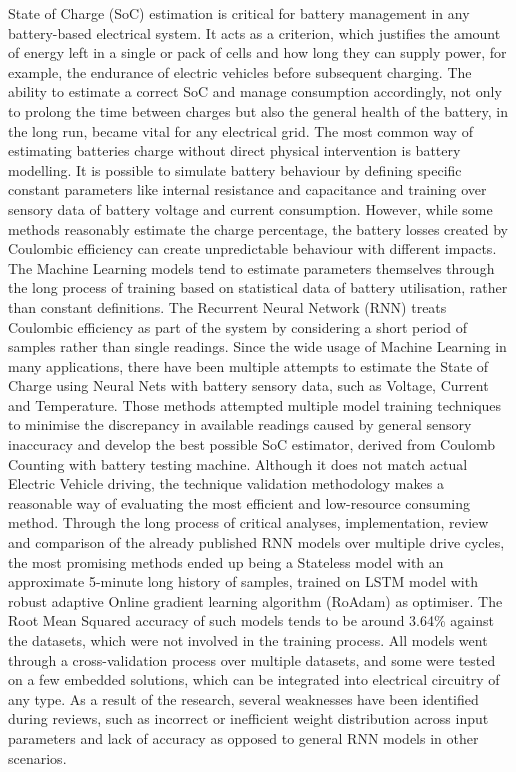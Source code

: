 %
%
{
State of Charge (SoC) estimation is critical for battery management in any battery-based electrical system.
It acts as a criterion, which justifies the amount of energy left in a single or pack of cells and how long they can supply power, for example, the endurance of electric vehicles before subsequent charging.
The ability to estimate a correct SoC and manage consumption accordingly, not only to prolong the time between charges but also the general health of the battery, in the long run, became vital for any electrical grid.
The most common way of estimating batteries charge without direct physical intervention is battery modelling.
It is possible to simulate battery behaviour by defining specific constant parameters like internal resistance and capacitance and training over sensory data of battery voltage and current consumption.
However, while some methods reasonably estimate the charge percentage, the battery losses created by Coulombic efficiency can create unpredictable behaviour with different impacts.
The Machine Learning models tend to estimate parameters themselves through the long process of training based on statistical data of battery utilisation, rather than constant definitions.
The Recurrent Neural Network (RNN) treats Coulombic efficiency as part of the system by considering a short period of samples rather than single readings.
Since the wide usage of Machine Learning in many applications, there have been multiple attempts to estimate the State of Charge using Neural Nets with battery sensory data, such as Voltage, Current and Temperature.
Those methods attempted multiple model training techniques to minimise the discrepancy in available readings caused by general sensory inaccuracy and develop the best possible SoC estimator, derived from Coulomb Counting with battery testing machine.
Although it does not match actual Electric Vehicle driving, the technique validation methodology makes a reasonable way of evaluating the most efficient and low-resource consuming method.
Through the long process of critical analyses, implementation, review and comparison of the already published RNN models over multiple drive cycles, the most promising methods ended up being a Stateless model with an approximate 5-minute long history of samples, trained on LSTM model with robust adaptive Online gradient learning algorithm (RoAdam) as optimiser.
The Root Mean Squared accuracy of such models tends to be around 3.64\% against the datasets, which were not involved in the training process.
All models went through a cross-validation process over multiple datasets, and some were tested on a few embedded solutions, which can be integrated into electrical circuitry of any type.
As a result of the research, several weaknesses have been identified during reviews, such as incorrect or inefficient weight distribution across input parameters and lack of accuracy as opposed to general RNN models in other scenarios.
}
